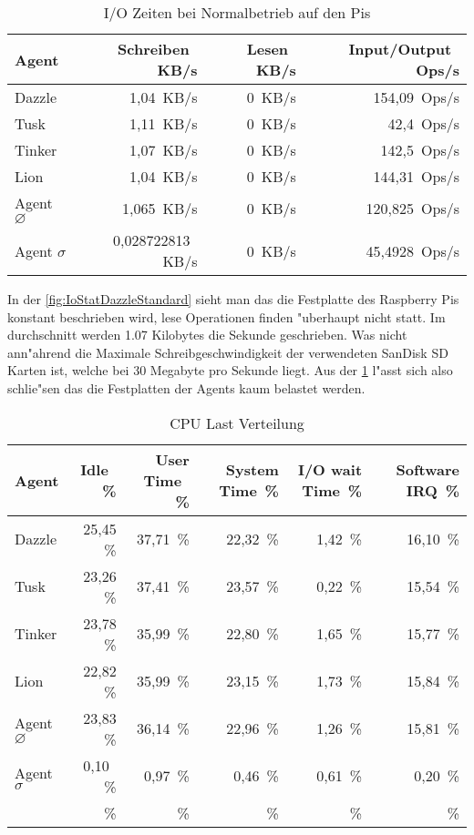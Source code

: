 \begin{table}
\centering
\begin{tabular}{l%
 r<{\,KB/s}%
 r<{\,KB/s}%
 r<{\,Ops/s}%
}
Agent	  			& Schreiben	 	& Lesen			& Input/Output 		\\	
\hline
Dazzle 				& 1,04			& 0			& 154,09	        \\
Tusk 				& 1,11			& 0			& 42,4			\\
Tinker				& 1,07 			& 0			& 142,5		 	\\
Lion				& 1,04			& 0			& 144,31	 	\\
Agent $\diameter $  		& 1,065			& 0			& 120,825		\\   
Agent $\sigma $ 		& 0,028722813  		& 0			& 45,4928		\\
\end{tabular}
\caption{I/O Zeiten bei Normalbetrieb auf den Pis}
\label{tab:NormalbetriebIoStat200Mb}
\end{table}


In der \cref{fig:IoStatDazzleStandard} sieht man das die Festplatte des Raspberry Pis konstant beschrieben wird, lese Operationen finden "uberhaupt nicht statt. %
Im durchschnitt werden 1.07 Kilobytes die Sekunde geschrieben.  %
Was nicht ann"ahrend die Maximale Schreibgeschwindigkeit der verwendeten %
SanDisk SD Karten ist, welche bei 30 Megabyte pro Sekunde \autocite{san:sd} liegt. %
Aus der \cref{tab:NormalbetriebIoStat200Mb} l"asst sich also schlie"sen das die Festplatten der Agents kaum belastet werden. %

\begin{table}
\centering
\begin{tabular}{l%
 r<{\,\%}%
 r<{\,\%}%
 r<{\,\%}%
 r<{\,\%}%
 r<{\,\%}%
}
Agent  				& Idle			& User Time		& System Time		& I/O wait Time	& Software IRQ	\\
\hline
Dazzle 				& 25,45			& 37,71			& 22,32 		& 1,42		& 16,10	\\
Tusk 				& 23,26			& 37,41			& 23,57			& 0,22		& 15,54	\\
Tinker				& 23,78			& 35,99			& 22,80			& 1,65		& 15,77	\\
Lion				& 22,82			& 35,99			& 23,15			& 1,73		& 15,84	\\ 
Agent $\diameter $  		& 23,83			& 36,14			& 22,96			& 1,26	 	& 15,81	\\   
Agent $\sigma $			&  0,10			&  0,97			&  0,46			& 0,61		& 0,20  \\ %
%
&\end{tabular}
\caption{CPU Last Verteilung}
\label{tab:CPUlastverteilung200Mb}
\end{table}


